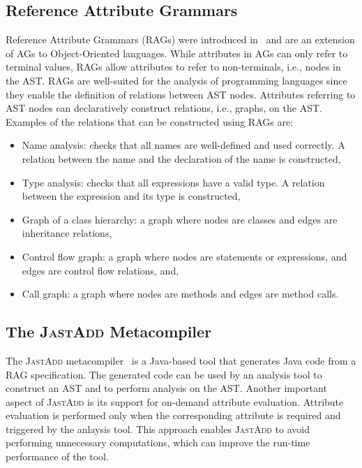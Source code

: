 \subsection{Reference Attribute Grammars}%
\label{sec:rag}
Reference Attribute Grammars (RAGs) were introduced in~\cite{hedin2000rags}
and are an extension of AGs to Object-Oriented languages. While attributes in AGs
can only refer to terminal values, RAGs allow attributes to refer to non-terminals, i.e., nodes in the AST.
RAGs are well-suited for the analysis of programming languages since they enable
the definition of relations between AST nodes. Attributes referring
to AST nodes can declaratively construct relations, i.e., graphs, on the AST.
Examples of the relations that can be constructed using RAGs are:
\begin{itemize}
    \item Name analysis: checks that all names are well-defined and used correctly. A relation between
    the name and the declaration of the name is constructed,
    \item Type analysis: checks that all expressions have a valid type. A relation between the expression
    and its type is constructed,
    \item Graph of a class hierarchy: a graph where nodes are classes and edges are inheritance relations,
    \item Control flow graph: a graph where nodes are statements or expressions, and edges are control flow relations, and,
    \item Call graph: a graph where nodes are methods and edges are method calls.
\end{itemize}



\subsection{The \textsc{JastAdd} Metacompiler}%
\label{sec:jastadd}
The \textsc{JastAdd} metacompiler~\cite{DBLP:journals/entcs/HedinM01} is a Java-based tool that generates
Java code from a RAG specification. The generated code can be used by an analysis tool to construct an AST and to perform
analysis on the AST.
Another important aspect of \textsc{JastAdd} is its support for on-demand attribute evaluation.
Attribute evaluation is performed only when the corresponding
attribute is required and triggered by the anlaysis tool. This approach enables \textsc{JastAdd} to
avoid performing unnecessary computations, which can improve the run-time
performance of the tool.


